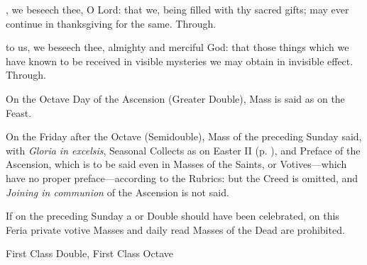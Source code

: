 \postcommunion
{}, we beseech thee, O Lord: that we, being filled with thy sacred gifts; may ever continue in thanksgiving for the same. Through.\\
\par{}
 to us, we beseech thee, almighty and merciful God: that those things which we have known to be received in visible mysteries we may obtain in invisible effect. Through.
\begin{rubric}
    On the Octave Day of the Ascension (Greater Double), Mass is said as on the Feast.
\end{rubric}
\begin{rubric}
    On the Friday after the Octave (Semidouble), Mass of the preceding Sunday said, with \emph{Gloria in excelsis}, Seasonal Collects as on Easter II (p. \pageref{EasterII}), and Preface of the Ascension, which is to be said even in Masses of the Saints, or Votives---which have no proper preface---according to the Rubrics: but the Creed is omitted, and \emph{Joining in communion} of the Ascension is not said.
\end{rubric}
\begin{rubric}
    If on the preceding Sunday a  or  Double should have been celebrated, on this Feria private votive Masses and daily read Masses of the Dead are prohibited.
\end{rubric}

\clearpage

\begin{inhead}
    {First Class Double, First Class Octave}
\end{inhead}

\properantiphonfix


